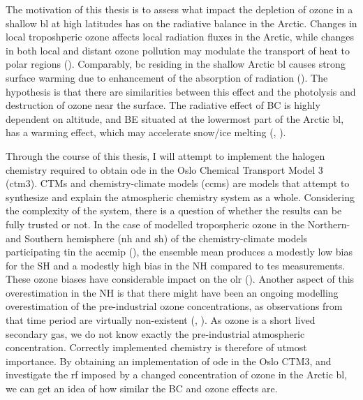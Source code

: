 \medskip

The motivation of this thesis is to assess what impact the depletion of ozone in a shallow \acrshort{bl} at high latitudes has on the radiative balance in the Arctic. Changes in local troposhperic ozone affects local radiation fluxes in the Arctic, while changes in both local and distant ozone pollution may modulate the transport of heat to polar regions (\cite{Shindell2007}). Comparably, \acrfull{bc} residing in the shallow Arctic \acrshort{bl} causes strong surface warming due to enhancement of the absorption of radiation (\cite{Flanner2013}). The hypothesis is that there are similarities between this effect and the photolysis and destruction of ozone near the surface. The radiative effect of BC is highly dependent on altitude, and BE situated at the lowermost part of the Arctic \acrshort{bl}, has a warming effect, which may accelerate snow/ice melting (\cite{Flanner2013}, \cite{AMAP2015}). 

\medskip

Through the course of this thesis, I will attempt to implement the halogen chemistry required to obtain \acrshort{ode} in the Oslo Chemical Transport Model 3 (\acrshort{ctm}3). CTMs and chemistry-climate models (\acrshort{ccm}s) are models that attempt to synthesize and explain the atmospheric chemistry system as a whole. Considering the complexity of the system, there is a question of whether the results can be fully trusted or not. In the case of modelled tropospheric ozone in the Northern- and Southern hemisphere (\acrshort{nh} and \acrshort{sh}) of the chemistry-climate models participating tin the \acrfull{accmip} (\cite{Bowman2013}), the ensemble mean produces a modestly low bias for the SH and a modestly high bias in the NH compared to \acrfull{tes} measurements. These ozone biases have considerable impact on the \acrfull{olr} (\cite{Bowman2013}). Another aspect of this overestimation in the NH is that there might have been an ongoing modelling overestimation of the pre-industrial ozone concentrations, as observations from that time period are virtually non-existent (\cite{shindell2003}, \cite{Parrish2014}). As ozone is a short lived secondary gas, we do not know exactly the pre-industrial atmospheric concentration. Correctly implemented chemistry is therefore of utmost importance. By obtaining an implementation of \acrshort{ode} in the Oslo CTM3, and investigate the \acrshort{rf} imposed by a changed concentration of ozone in the Arctic \acrshort{bl}, we can get an idea of how similar the BC and ozone effects are. 


